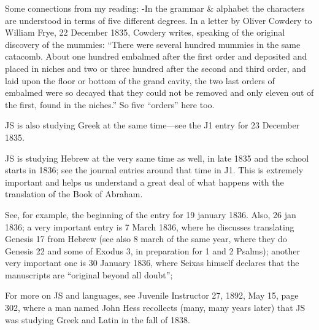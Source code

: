 \begin{compactitem}
	Some connections from my reading:
		-In the grammar \& alphabet the characters are understood in terms of five different degrees. In a letter by Oliver Cowdery to William Frye, 22 December 1835, Cowdery writes, speaking of the original discovery of the mummies: ``There were several hundred mummies in the same catacomb. About one hundred embalmed after the first order and deposited and placed in niches and two or three hundred after the second and third order, and laid upon the floor or bottom of the grand cavity, the two last orders of embalmed were so decayed that they could not be removed and only eleven out of the first, found in the niches.'' So five ``orders'' here too.
		\item JS is also studying Greek at the same time---see the J1 entry for 23 December 1835.
		\item JS is studying Hebrew at the very same time as well, in late 1835 and the school starts in 1836; see the journal entries around that time in J1. This is extremely important and helps us understand a great deal of what happens with the translation of the Book of Abraham.
			\begin{compactitem}
				\item See, for example, the beginning of the entry for 19 january 1836.
					Also, 26 jan 1836; a very important entry is 7 March 1836, where he discusses translating Genesis 17 from Hebrew (see also 8 march of the same year, where they do Genesis 22 and some of Exodus 3, in preparation for 1 and 2 Psalms); another very important one is 30 January 1836, where Seixas himself declares that the manuscripts are ``original beyond all doubt''; 
				\item For more on JS and languages, see Juvenile Instructor 27, 1892, May 15, page 302, where a man named John Hess recollects (many, many years later) that JS was studying Greek and Latin in the fall of 1838.
			\end{compactitem}
		\end{compactitem}
		
